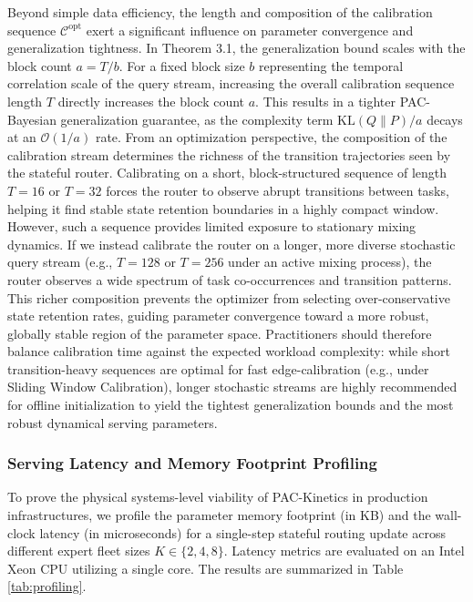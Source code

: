 Beyond simple data efficiency, the length and composition of the calibration sequence $\mathcal{C}^{\text{opt}}$ exert a significant influence on parameter convergence and generalization tightness. In Theorem 3.1, the generalization bound scales with the block count $a = T / b$. For a fixed block size $b$ representing the temporal correlation scale of the query stream, increasing the overall calibration sequence length $T$ directly increases the block count $a$. This results in a tighter PAC-Bayesian generalization guarantee, as the complexity term $\text{KL}(Q \| P) / a$ decays at an $\mathcal{O}(1/a)$ rate. From an optimization perspective, the composition of the calibration stream determines the richness of the transition trajectories seen by the stateful router. Calibrating on a short, block-structured sequence of length $T=16$ or $T=32$ forces the router to observe abrupt transitions between tasks, helping it find stable state retention boundaries in a highly compact window. However, such a sequence provides limited exposure to stationary mixing dynamics. If we instead calibrate the router on a longer, more diverse stochastic query stream (e.g., $T=128$ or $T=256$ under an active mixing process), the router observes a wide spectrum of task co-occurrences and transition patterns. This richer composition prevents the optimizer from selecting over-conservative state retention rates, guiding parameter convergence toward a more robust, globally stable region of the parameter space. Practitioners should therefore balance calibration time against the expected workload complexity: while short transition-heavy sequences are optimal for fast edge-calibration (e.g., under Sliding Window Calibration), longer stochastic streams are highly recommended for offline initialization to yield the tightest generalization bounds and the most robust dynamical serving parameters.

\subsubsection{Serving Latency and Memory Footprint Profiling}
To prove the physical systems-level viability of PAC-Kinetics in production infrastructures, we profile the parameter memory footprint (in KB) and the wall-clock latency (in microseconds) for a single-step stateful routing update across different expert fleet sizes $K \in \{2, 4, 8\}$. Latency metrics are evaluated on an Intel Xeon CPU utilizing a single core. The results are summarized in Table \ref{tab:profiling}.

